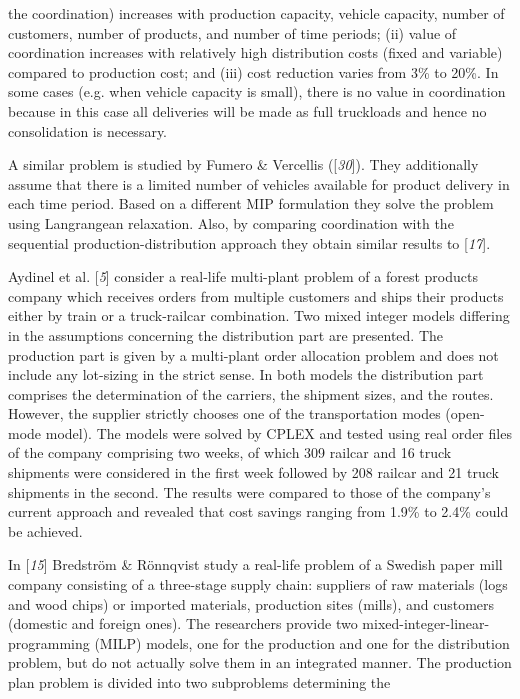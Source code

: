 the coordination) increases with production capacity, vehicle capacity, number of
 customers, number of products, and number of time periods; (ii) value of coordination
 increases with relatively high distribution costs (fixed and variable) compared to
 production cost; and (iii) cost reduction varies from 3\% to 20\%. In some cases (e.g.
 when vehicle capacity is small), there is no value in coordination because in this
 case all deliveries will be made as full truckloads and hence no consolidation is
 necessary.\par A similar problem is studied by Fumero \& Vercellis ([\textit{30}]). They additionally assume that there is a limited number of
 vehicles available for product delivery in each time period. Based on a different MIP
 formulation they solve the problem using Langrangean relaxation. Also, by comparing
 coordination with the sequential production-distribution approach they obtain similar
 results to [\textit{17}].\par Aydinel et al. [\textit{5}] consider a real-life
 multi-plant problem of a forest products company which receives orders from multiple
 customers and ships their products either by train or a truck-railcar combination.
 Two mixed integer models differing in the assumptions concerning the distribution
 part are presented. The production part is given by a multi-plant order allocation
 problem and does not include any lot-sizing in the strict sense. In both models the
 distribution part comprises the determination of the carriers, the shipment sizes,
 and the routes. However, the supplier strictly chooses one of the transportation
 modes (open-mode model). The models were solved by CPLEX and tested using real order
 files of the company comprising two weeks, of which 309 railcar and 16 truck
 shipments were considered in the first week followed by 208 railcar and 21 truck
 shipments in the second. The results were compared to those of the company's current
 approach and revealed that cost savings ranging from 1.9\% to 2.4\% could be
 achieved.\par In [\textit{15}] Bredström \& Rönnqvist study a
 real-life problem of a Swedish paper mill company consisting of a three-stage supply
 chain: suppliers of raw materials (logs and wood chips) or imported materials,
 production sites (mills), and customers (domestic and foreign ones). The researchers
 provide two mixed-integer-linear-programming (MILP) models, one for the production
 and one for the distribution problem, but do not actually solve them in an integrated
 manner. The production plan problem is divided into two subproblems determining the

